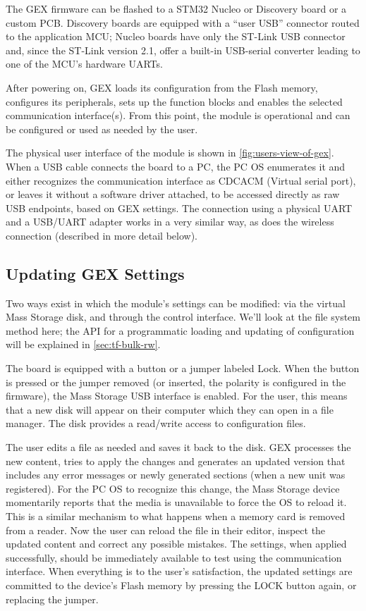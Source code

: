 The GEX firmware can be flashed to a STM32 Nucleo or Discovery board or a custom \gls{PCB}. Discovery boards are equipped with a ``user \gls{USB}'' connector routed to the application \gls{MCU}; Nucleo boards have only the ST-Link \gls{USB} connector and, since the ST-Link version 2.1, offer a built-in USB-serial converter leading to one of the \gls{MCU}'s hardware \glspl{UART}.

After powering on, GEX loads its configuration from the Flash memory, configures its peripherals, sets up the function blocks and enables the selected communication interface(s). From this point, the module is operational and can be configured or used as needed by the user.

The physical user interface of the module is shown in \cref{fig:users-view-of-gex}. When a \gls{USB} cable connects the board to a \gls{PC}, the \gls{PC} \gls{OS} enumerates it and either recognizes the communication interface as \gls{CDCACM} (Virtual serial port), or leaves it without a software driver attached, to be accessed directly as raw \gls{USB} endpoints, based on GEX settings.
The connection using a physical UART and a USB/UART adapter works in a very similar way, as does the wireless connection (described in more detail below).

\subsection{Updating GEX Settings}

Two ways exist in which the module's settings can be modified: via the virtual Mass Storage disk, and through the control interface. We'll look at the file system method here; the API for a programmatic loading and updating of configuration will be explained in \cref{sec:tf-bulk-rw}.

The board is equipped with a button or a jumper labeled Lock. When the button is pressed or the jumper removed (or inserted, the polarity is configured in the firmware), the Mass Storage \gls{USB} interface is enabled. For the user, this means that a new disk will appear on their computer which they can open in a file manager. The disk provides a read/write access to configuration files.

The user edits a file as needed and saves it back to the disk. GEX processes the new content, tries to apply the changes and generates an updated version that includes any error messages or newly generated sections (when a new unit was registered). For the \gls{PC} \gls{OS} to recognize this change, the Mass Storage device momentarily reports that the media is unavailable to force the \gls{OS} to reload it. This is a similar mechanism to what happens when a memory card is removed from a reader. Now the user can reload the file in their editor, inspect the updated content and correct any possible mistakes. The settings, when applied successfully, should be immediately available to test using the communication interface. When everything is to the user's satisfaction, the updated settings are committed to the device's Flash memory by pressing the LOCK button again, or replacing the jumper.

